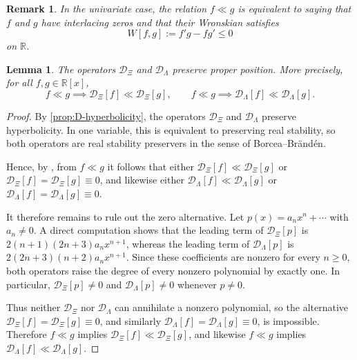 \documentclass[11pt,twoside]{article}
\newtheorem{lemma}[theorem]{Lemma}
\newtheorem{remark}[theorem]{Remark}
\numberwithin{equation}{section}
\begin{document}
\begin{remark}
In the univariate case, the relation \(f\ll g\) is equivalent to saying that \(f\) and \(g\) have interlacing zeros and that their Wronskian satisfies
\[
W[f,g]:=f'g-fg'\le 0
\]
on \(\mathbb R\).
\end{remark}

\begin{lemma}\label{lem:proper-position-preservation}
The operators \(\mathcal D_{\Xi}\) and \(\mathcal D_{\Lambda}\) preserve proper position. More precisely, for all \(f,g\in\mathbb R[x]\),
\[
f\ll g \implies \mathcal D_{\Xi}[f]\ll \mathcal D_{\Xi}[g],
\qquad
f\ll g \implies \mathcal D_{\Lambda}[f]\ll \mathcal D_{\Lambda}[g].
\]
\end{lemma}

\begin{proof}
By \cref{prop:D-hyperbolicity}, the operators \(\mathcal D_{\Xi}\) and
\(\mathcal D_{\Lambda}\) preserve hyperbolicity. In one variable, this is
equivalent to preserving real stability, so both operators are real stability
preservers in the sense of Borcea--Br\"and\'en.

Hence, by \cite[Theorem~4.3]{BB2009}, from \(f\ll g\) it follows that either
\(\mathcal D_{\Xi}[f]\ll \mathcal D_{\Xi}[g]\) or
\(\mathcal D_{\Xi}[f]=\mathcal D_{\Xi}[g]\equiv 0\), and likewise either
\(\mathcal D_{\Lambda}[f]\ll \mathcal D_{\Lambda}[g]\) or
\(\mathcal D_{\Lambda}[f]=\mathcal D_{\Lambda}[g]\equiv 0\).

It therefore remains to rule out the zero alternative. Let
\(p(x)=a_nx^n+\cdots\) with \(a_n\neq 0\). A direct computation shows that the
leading term of \(\mathcal D_{\Xi}[p]\) is
\(2(n+1)(2n+3)a_n x^{n+1}\), whereas the leading term of
\(\mathcal D_{\Lambda}[p]\) is \(2(2n+3)(n+2)a_n x^{n+1}\). Since these
coefficients are nonzero for every \(n\ge 0\), both operators raise the degree
of every nonzero polynomial by exactly one. In particular,
\(\mathcal D_{\Xi}[p]\neq 0\) and \(\mathcal D_{\Lambda}[p]\neq 0\) whenever
\(p\neq 0\).

Thus neither \(\mathcal D_{\Xi}\) nor \(\mathcal D_{\Lambda}\) can annihilate a
nonzero polynomial, so the alternative
\(\mathcal D_{\Xi}[f]=\mathcal D_{\Xi}[g]\equiv 0\), and similarly
\(\mathcal D_{\Lambda}[f]=\mathcal D_{\Lambda}[g]\equiv 0\), is impossible.
Therefore \(f\ll g\) implies \(\mathcal D_{\Xi}[f]\ll \mathcal D_{\Xi}[g]\),
and likewise \(f\ll g\) implies
\(\mathcal D_{\Lambda}[f]\ll \mathcal D_{\Lambda}[g]\).
\end{proof}
\end{document}
